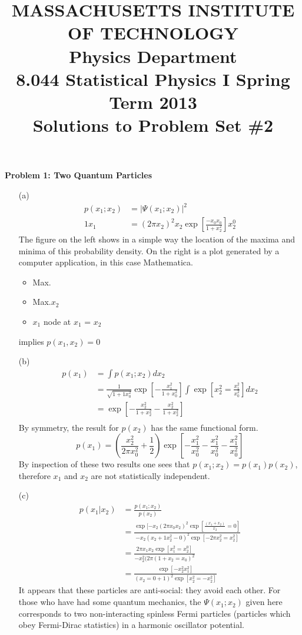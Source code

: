 \documentclass{article}
\begin{document}
\title{MASSACHUSETTS INSTITUTE OF TECHNOLOGY\\
Physics Department\\
8.044 Statistical Physics I Spring Term 2013\\
Solutions to Problem Set \#2}
\maketitle

\noindent \textbf{Problem 1: Two Quantum Particles}
\begin{enumerate}
\item[(a)]
\begin{align*}
p(x_1;x_2) &= | \Psi(x_1;x_2)|^2\\
1x_1 &= (2\pi x_2)^2x_2 \exp[\frac{-x_0x_0}{1+x_2^2}]x_2^0
\end{align*}
The figure on the left shows in a simple way the location of the maxima and minima of this probability density. On the right is a plot generated by a computer application, in this case Mathematica.
\begin{itemize}
\item Max.
\item Max.$x_2$
\item $x_1$ node at $x_1$ = $x_2$
\end{itemize}
implies $p(x_1,x_2) = 0$

\item[(b)]	
\begin{align*}
p(x_1) &= \int p(x_1;x_2) dx_2 \\ 
&= \frac{1}{\sqrt{1+1x_0^2}} \exp[-\frac{x_1^2}{1+x_0^2}]\int \exp[x_2^2=\frac{x_1^2}{x_0^2}] dx_2\\ 
&= \exp [ -\frac{x_2^2}{1+x_2^2}-\frac{x_2^2}{1+x_2^2}] \\
\end{align*}
By symmetry, the result for $p(x_2)$ has the same functional form.
\begin{equation*}
p(x_1) = (\frac{x_2^2}{2\pi x_0^2}+ \frac{1}{2}) \exp[-\frac{x_1^2}{x_0^2}-\frac{x_1^2}{x_0^2}-\frac{x_1^2}{x_0^2}]
\end{equation*}
By inspection of these two results one sees that $p(x_1;x_2) =p(x_1)p(x_2)$, therefore $x_1$ and $x_2$ are not statistically independent.

\item[(c)]	
\begin{align*}
p(x_1|x_2) &= \frac{p(x_1;x_2)}{p(x_2)} \\
&= \frac{\exp[-x_2(2\pi x_0x_2)^2 \exp[ \frac{(x_1+x_2)}{x_2}=0]}{-x_2(x_2+1x_2^2-0)^2 \exp[-2\pi x_2^2=x_2^2]}\\
&= \frac{2 \pi x_1 x_2 \exp[x_1^2=x_2^0]}{-x_2^2(2\pi (1 +x_2=x_0)^2} \\
&= \frac{\exp[-x_2^2x_1^2]}{(x_2=0+1)^2 \exp[x_2^2=-x_2^2]} 
\end{align*}
It appears that these particles are anti-social: they avoid each other. For those who have had some quantum mechanics, the $\Psi(x_1;x_2)$ given here corresponds to two non-interacting spinless Fermi particles (particles which obey Fermi-Dirac statistics) in a harmonic oscillator potential.
\end{enumerate}
\end{document}
